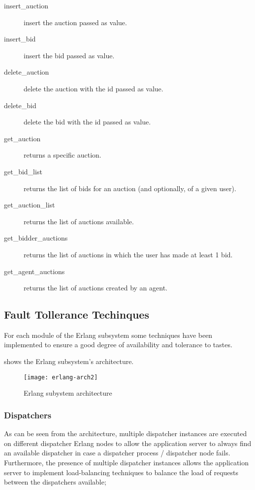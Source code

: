 \begin{description}
	\item[insert\_auction] insert the auction passed as value.
	\item[insert\_bid] insert the bid passed as value.
	\item[delete\_auction] delete the auction with the id passed as value.
	\item[delete\_bid] delete the bid with the id passed as value.
	\item[get\_auction] returns a specific auction.
	\item[get\_bid\_list] returns the list of bids for an auction (and
		optionally, of a given user).
	\item[get\_auction\_list] returns the list of auctions available.
	\item[get\_bidder\_auctions] returns the list of auctions in which the
		user has made at least 1 bid.
	\item[get\_agent\_auctions] returns the list of auctions created by an
		agent.
\end{description}

\subsection{Fault Tollerance Techinques}
For each module of the Erlang subsystem some techniques have been implemented to
ensure a good degree of availability and tolerance to tastes.

 shows the Erlang subsystem's architecture.

\begin{figure}[htb]
	\centering
	\texttt{[image: erlang-arch2]}
	\caption{Erlang subystem architecture}\label{fig:erlang-arch2}
\end{figure}

\subsubsection{Dispatchers}

As can be seen from the architecture, multiple dispatcher instances are executed
on different dispatcher Erlang nodes to allow the application server to always
find an available dispatcher in case a dispatcher process / dispatcher node
fails. Furthermore, the presence of multiple dispatcher instances allows the
application server to implement load-balancing techniques to balance the load of
requests between the dispatchers available;


